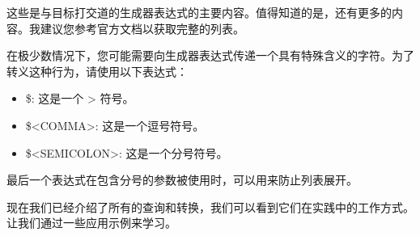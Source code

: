 这些是与目标打交道的生成器表达式的主要内容。值得知道的是，还有更多的内容。我建议您参考官方文档以获取完整的列表。


在极少数情况下，您可能需要向生成器表达式传递一个具有特殊含义的字符。为了转义这种行为，请使用以下表达式：

\begin{itemize}
\item
\$<ANGLE-R>: 这是一个 > 符号。

\item
\$<COMMA>: 这是一个逗号符号。

\item
\$<SEMICOLON>: 这是一个分号符号。
\end{itemize}

最后一个表达式在包含分号的参数被使用时，可以用来防止列表展开。

现在我们已经介绍了所有的查询和转换，我们可以看到它们在实践中的工作方式。让我们通过一些应用示例来学习。









